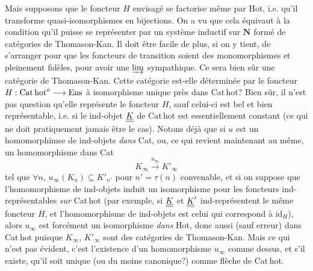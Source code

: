 Mais supposons que le foncteur $H$ envisagé se factorise même par Hot, i.e. qu'il transforme quasi-isomorphismes en bijections. On a vu que cela équivaut à la condition qu'il puisse se représenter par un système inductif sur $\mathbf{N}$ formé de catégories de Thomason-Kan. Il doit être facile de plus, si on y tient, de s'arranger pour que les foncteurs de transition soient des monomorphismes et pleinement fidèles, pour avoir une $\varinjlim$ sympathique. Ce sera bien sûr une catégorie de Thomason-Kan. Cette catégorie est-elle déterminée par le foncteur $H : \mathrm{Cat\,hot}^{o} \longrightarrow \mathrm{Ens}$ à isomorphisme unique près dans Cat\,hot? Bien sûr, il n'est pas question qu'elle représente le foncteur $H$, sauf celui-ci est bel et bien représentable, i.e. si le ind-objet $\underline{\underline{K}}$ de Cat\,hot est essentiellement constant (ce qui ne doit pratiquement jamais être le cas). Notons déjà
que si $u$ est un homomorphimse de ind-objets \textit{dans} Cat, ou, ce qui revient maintenant au même, un homomorphisme dans Cat %
\[
K_\infty \xrightarrow{u_\infty} K'_\infty
\]
tel que $\forall n$, $u_\infty(K_n) \subseteq K'_{n'}$ pour $n' = \tau(n)$ convenable, et si on suppose que l'homomorphisme de ind-objets induit un isomorphisme pour les foncteurs ind-représentables \textit{sur} Cat\,hot (par exemple, si $\underline{\underline{K}}$ et $\underline{\underline{K}}'$ ind-représentent le même foncteur $H$, et l'homomorphisme de ind-objets est celui qui correspond à $\mathrm{id}_H$), alors $u_\infty$ est forcément un isomorphisme \textit{dans} Hot, donc aussi (sauf erreur) dans Cat\,hot puisque $K_\infty$, $K'_\infty$ sont des catégories de Thomason-Kan. Mais ce qui n'est pas évident, c'est l'existence d'un homomorphisme $u_\infty$ comme dessus, et s'il existe, qu'il soit unique (ou du moins canonique?) comme flèche de Cat\,hot.

